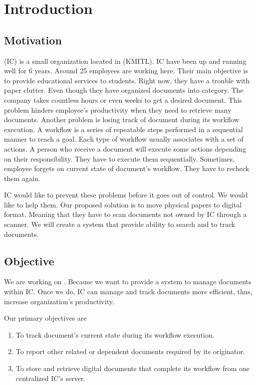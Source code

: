 \chapter{Introduction}

\section{Motivation}
\IC (IC) is a small organization located in \kmitl (KMITL). 
IC have been up and running well for 6 years. 
Around 25 employees are working here. 
Their main objective is to provide educational services to students. 
Right now, they have a trouble with paper clutter. 
Even though they have organized documents into category. 
The company takes countless hours or even weeks to get a desired document. 
This problem hinders employee's productivity when they need to retrieve many documents. 
Another problem is losing track of document during its workflow execution. 
A workflow is a series of repeatable steps performed in a sequential manner to reach a goal.
Each type of workflow usually associates with a set of actions. 
A person who receive a document will execute some actions depending on their responsibility.
They have to execute them sequentially. 
Sometimes, employee forgets on current state of document's workflow. 
They have to recheck them again.

IC would like to prevent these problems before it goes out of control. 
We would like to help them. 
Our proposed solution is to move physical papers to digital format. 
Meaning that they have to scan documents not owned by IC through a scanner. 
We will create a system that provide ability to search and to track documents.

\section{Objective}
We are working on \dms.
Because we want to provide a system to manage documents within IC.
Once we do, IC can manage and track documents more efficient, thus, increase organization's productivity.

Our primary objectives are
\begin{enumerate}
\item To track document's current state during its workflow execution.
\item To report other related or dependent documents required by its originator.
\item To store and retrieve digital documents that complete its workflow from one centralized IC's server.
\end{enumerate}

